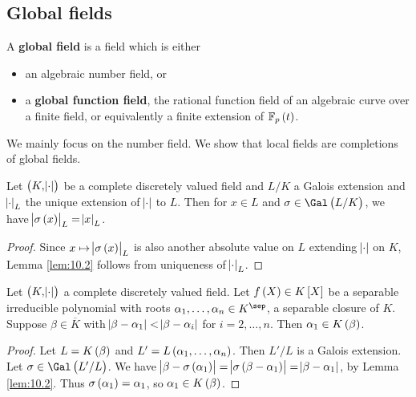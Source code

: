 \pagebreak

\subsection{Global fields}


\begin{definition}
A \textbf{global field} is a field which is either
\begin{itemize}
\item an algebraic number field, or
\item a \textbf{global function field}, the rational function field of an algebraic curve over a finite field, or equivalently a finite extension of $ \FF_p\br{t} $.
\end{itemize}
\end{definition}

We mainly focus on the number field. We show that local fields are completions of global fields.

\begin{lemma}
\label{lem:10.2}
Let $ \br{K, \abs{\cdot}} $ be a complete discretely valued field and $ L / K $ a Galois extension and $ \abs{\cdot}_L $ the unique extension of $ \abs{\cdot} $ to $ L $. Then for $ x \in L $ and $ \sigma \in \Gal\br{L / K} $, we have $ \abs{\sigma\br{x}}_L = \abs{x}_L $.
\end{lemma}

\begin{proof}
Since $ x \mapsto \abs{\sigma\br{x}}_L $ is also another absolute value on $ L $ extending $ \abs{\cdot} $ on $ K $, Lemma \ref{lem:10.2} follows from uniqueness of $ \abs{\cdot}_L $.
\end{proof}

\begin{lemma}
Let $ \br{K, \abs{\cdot}} $ a complete discretely valued field. Let $ f\br{X} \in K\sbr{X} $ be a separable irreducible polynomial with roots $ \alpha_1, \dots, \alpha_n \in K^{\sep} $, a separable closure of $ K $. Suppose $ \beta \in \overline{K} $ with $ \abs{\beta - \alpha_1} < \abs{\beta - \alpha_i} $ for $ i = 2, \dots, n $. Then $ \alpha_1 \in K\br{\beta} $.
\end{lemma}

\begin{proof}
Let $ L = K\br{\beta} $ and $ L' = L\br{\alpha_1, \dots, \alpha_n} $. Then $ L' / L $ is a Galois extension. Let $ \sigma \in \Gal\br{L' / L} $. We have $ \abs{\beta - \sigma\br{\alpha_1}} = \abs{\sigma\br{\beta - \alpha_1}} = \abs{\beta - \alpha_1} $, by Lemma \ref{lem:10.2}. Thus $ \sigma\br{\alpha_1} = \alpha_1 $, so $ \alpha_1 \in K\br{\beta} $.
\end{proof}

